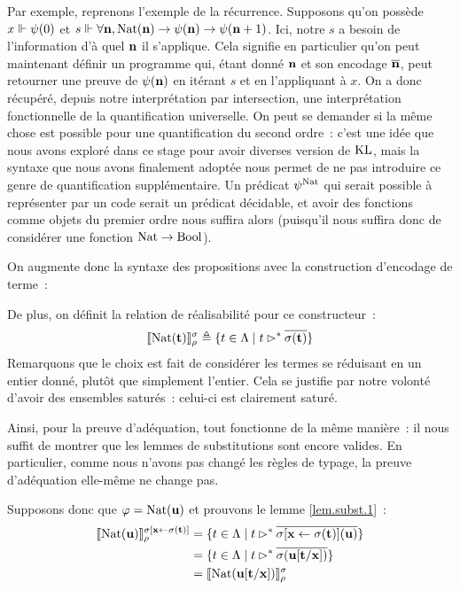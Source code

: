 \documentclass{article}
\begin{document}
Par exemple, reprenons l'exemple de la récurrence. Supposons qu'on possède $x\reali \psi(0)$ et $s\reali \forall \bn, \Nat(\bn) \to \psi(\bn) \to \psi(\bn+1)$. Ici, notre $s$ a besoin de l'information d'à quel $\bn$ il s'applique. Cela signifie en particulier qu'on peut maintenant définir un programme qui, étant donné $\bn$ et son encodage $\overline{\bn}$, peut retourner une preuve de $\psi(\bn)$ en itérant $s$ et en l'appliquant à $x$. On a donc récupéré, depuis notre interprétation par intersection, une interprétation fonctionnelle de la quantification universelle. On peut se demander si la même chose est possible pour une quantification du second ordre~: c'est une idée que nous avons exploré dans ce stage pour avoir diverses version de $\KL$, mais la syntaxe que nous avons finalement adoptée nous permet de ne pas introduire ce genre de quantification supplémentaire. Un prédicat $\psi^{\Nat}$ qui serait possible à représenter par un code serait un prédicat décidable, et avoir des fonctions comme objets du premier ordre nous suffira alors (puisqu'il nous suffira donc de considérer une fonction $\Nat\to\Bool$).

On augmente donc la syntaxe des propositions avec la construction d'encodage de terme~:
\begin{center}
    \begin{prooftree}
    \end{prooftree}
\end{center}

De plus, on définit la relation de réalisabilité pour ce constructeur~:
\[\trad{\Nat(\bt)}_\rho^\sigma \defeq \{t\in \Lambda\mid t \rhd^* \overline{\sigma(\bt)}\}\]
Remarquons que le choix est fait de considérer les termes se réduisant en un entier donné, plutôt que simplement l'entier. Cela se justifie par notre volonté d'avoir des ensembles saturés~: celui-ci est clairement saturé.

Ainsi, pour la preuve d'adéquation, tout fonctionne de la même manière~: il nous suffit de montrer que les lemmes de substitutions sont encore valides. En particulier, comme nous n'avons pas changé les règles de typage, la preuve d'adéquation elle-même ne change pas.

Supposons donc que $\varphi = \Nat(\bu)$ et prouvons le lemme \ref{lem.subst.1}~:
\begin{align*}
    \trad{\Nat(\bu)}_\rho^{\sigma[\bx\leftarrow \sigma(\bt)]} &= \{t \in \Lambda\mid t \rhd^* \overline{\sigma[\bx\leftarrow\sigma(\bt)](\bu)}\}\\
    &= \{ t \in \Lambda\mid t \rhd^* \overline{\sigma(\bu[\bt/\bx])}\}\\
    &= \trad{\Nat(\bu[\bt/\bx])}_\rho^\sigma
\end{align*}
\end{document}
